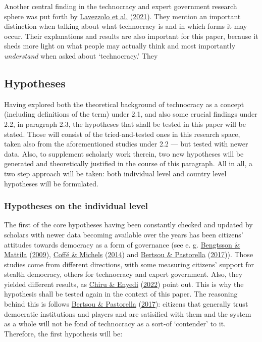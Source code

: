 \documentclass[
  12pt,
  english,
]{article}
\begin{document}
Another central finding in the technocracy and expert government
research sphere was put forth by
\protect\hyperlink{ref-lavezzolo2021will}{Lavezzolo et al.}
(\protect\hyperlink{ref-lavezzolo2021will}{2021}). They mention an
important distinction when talking about what technocracy is and in
which forms it may occur. Their explanations and results are also
important for this paper, because it sheds more light on what people may
actually think and most importantly \emph{understand} when asked about
`technocracy.' They

\hypertarget{hypotheses}{%
\subsection{Hypotheses}\label{hypotheses}}

Having explored both the theoretical background of technocracy as a
concept (including definitions of the term) under 2.1, and also some
crucial findings under 2.2, in paragraph 2.3, the hypotheses that shall
be tested in this paper will be stated. Those will consist of the
tried-and-tested ones in this research space, taken also from the
aforementioned studies under 2.2 --- but tested with newer data. Also,
to supplement scholarly work therein, two new hypotheses will be
generated and theoretically justified in the course of this paragraph.
All in all, a two step approach will be taken: both individual level and
country level hypotheses will be formulated.

\hypertarget{hypotheses-on-the-individual-level}{%
\subsubsection{Hypotheses on the individual
level}\label{hypotheses-on-the-individual-level}}

The first of the core hypotheses having been constantly checked and
updated by scholars with newer data becoming available over the years
has been citizens' attitudes towards democracy as a form of governance
(see e. g. \protect\hyperlink{ref-bengtsson2009direct}{Bengtsson \&
Mattila} (\protect\hyperlink{ref-bengtsson2009direct}{2009}),
\protect\hyperlink{ref-coffe2014education}{Coffé \& Michels}
(\protect\hyperlink{ref-coffe2014education}{2014}) and
\protect\hyperlink{ref-bertsou2017technocratic}{Bertsou \& Pastorella}
(\protect\hyperlink{ref-bertsou2017technocratic}{2017})). Those studies
come from different directions, with some measuring citizens' support
for stealth democracy, others for technocracy and expert government.
Also, they yielded different results, as
\protect\hyperlink{ref-chiru2022wants}{Chiru \& Enyedi}
(\protect\hyperlink{ref-chiru2022wants}{2022}) point out. This is why
the hypothesis shall be tested again in the context of this paper. The
reasoning behind this is follows
\protect\hyperlink{ref-bertsou2017technocratic}{Bertsou \& Pastorella}
(\protect\hyperlink{ref-bertsou2017technocratic}{2017}): citizens that
generally trust democratic institutions and players and are satisified
with them and the system as a whole will not be fond of technocracy as a
sort-of `contender' to it. Therefore, the first hypothesis will be:
\end{document}
